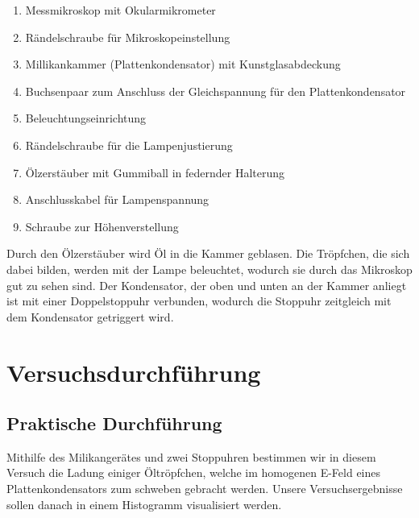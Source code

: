 \documentclass[12pt]{scrartcl}
\begin{document}
\begin{enumerate}
\item	Messmikroskop mit Okularmikrometer

\item	Rändelschraube für Mikroskopeinstellung

\item	Millikankammer (Plattenkondensator) mit Kunstglasabdeckung

\item	Buchsenpaar zum Anschluss der Gleichspannung für den Plattenkondensator

\item	Beleuchtungseinrichtung

\item	Rändelschraube für die Lampenjustierung

\item	Ölzerstäuber mit Gummiball in federnder Halterung

\item	Anschlusskabel für Lampenspannung

\item	Schraube zur Höhenverstellung
\end{enumerate}

Durch den Ölzerstäuber wird Öl in die Kammer geblasen. Die Tröpfchen, die sich dabei bilden, werden mit der Lampe beleuchtet, wodurch sie durch das Mikroskop gut zu sehen sind. Der Kondensator, der oben und unten an der Kammer anliegt ist mit einer Doppelstoppuhr verbunden, wodurch die Stoppuhr zeitgleich mit dem Kondensator getriggert wird.

\section{Versuchsdurchführung}


\subsection{Praktische Durchführung}
Mithilfe des Milikangerätes und zwei Stoppuhren bestimmen wir in diesem Versuch die Ladung einiger Öltröpfchen, welche im homogenen E-Feld eines Plattenkondensators zum schweben gebracht werden. Unsere Versuchsergebnisse sollen danach in einem Histogramm visualisiert werden.
\end{document}
